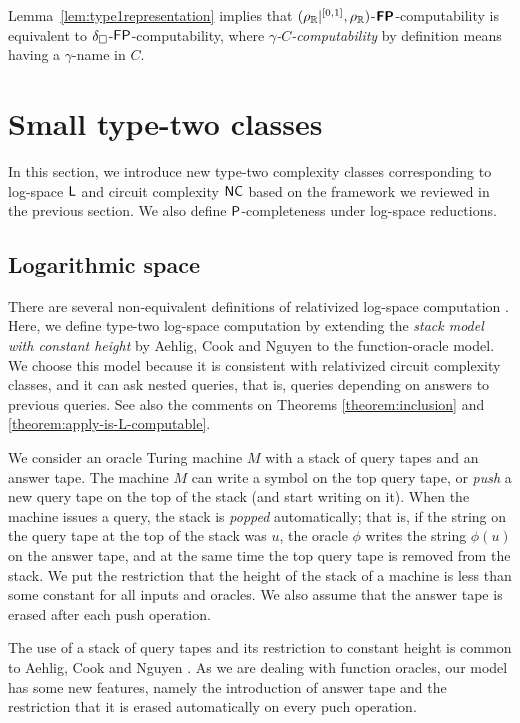 \documentclass[envcountsame,orivec,oribibl]{llncs}
\begin{document}
Lemma~\ref{lem:type1representation} implies that
$(\rho _\mathbb R|^{[0,1]},\rho _\mathbb R)$-$\text{\bfseries \sffamily \upshape FP}$-computability is equivalent to 
$\delta _\square$-$\mathsf{FP}$-computability,
where \emph{$\gamma$-$C$-computability} by definition means 
having a $\gamma$-name in $C$.


\section{Small type-two classes}
\label{section:small-classes}

In this section, we introduce new type-two complexity classes
corresponding to log-space $\mathsf{L}$ and circuit complexity $\mathsf{NC}$
based on the framework we reviewed in the previous section.
We also define $\mathsf{P}$-completeness under log-space reductions.

\subsection{Logarithmic space}
There are several non-equivalent definitions of 
relativized log-space computation
\cite{aehlig2007relativizing,buss1988relativized,ladner1976relativization,wilson1988measure}.
Here, we define type-two log-space computation 
by extending the {\em stack model with constant height} 
by Aehlig, Cook and Nguyen \cite{aehlig2007relativizing} to the 
function-oracle model.
We choose this model because it is consistent with relativized circuit complexity classes, 
and it can ask nested queries, that is, queries depending on answers to previous queries.
See also the comments on Theorems \ref{theorem:inclusion} and \ref{theorem:apply-is-L-computable}.

We consider an oracle Turing machine $M$ 
with a stack of query tapes and an answer tape.
The machine $M$ can write a symbol on the top query tape, or 
\emph{push} a new query tape on the top of the stack (and start writing on it).
When the machine issues a query, the stack is \emph{popped} automatically; 
that is, 
if the string on the query tape at the top of the stack was $u$, 
the oracle $\phi$ writes the string $\phi (u)$ on the answer tape, 
and at the same time the top query tape is removed from the stack. 
We put the restriction that the height of the stack of a machine is less than 
some constant for all inputs and oracles.
We also assume that 
the answer tape is erased after each push operation.

The use of a stack of query tapes and its restriction to constant height 
is common to Aehlig, Cook and Nguyen \cite{aehlig2007relativizing}. 
As we are dealing with function oracles, 
our model has some new features, namely 
the introduction of answer tape and 
the restriction that it is erased automatically on every puch operation. 
\end{document}
